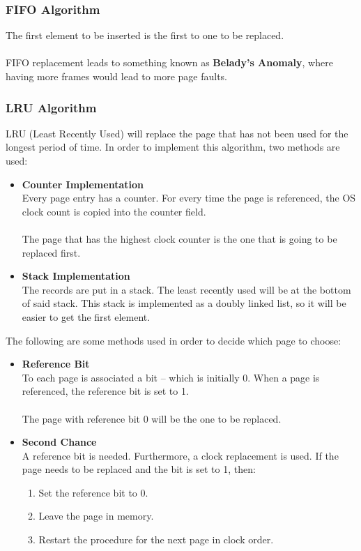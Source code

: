 \documentclass{article}
\begin{document}
\subsubsection{FIFO Algorithm}
The first element to be inserted is the first to one to be replaced. \\ \\
FIFO replacement leads to something known as \textbf{Belady's Anomaly}, where having more frames would lead to more page faults.

\subsubsection{LRU Algorithm}
LRU (Least Recently Used) will replace the page that has not been used for the longest period of time. In order to implement this algorithm, two methods are used:

\begin{itemize}
	\item \textbf{Counter Implementation}
	\vspace{.2cm} \\
	Every page entry has a counter. For every time the page is referenced, the OS clock count is copied into the counter field. \\ \\
	The page that has the highest clock counter is the one that is going to be replaced first.
	
	\item \textbf{Stack Implementation}
	\vspace{.2cm} \\
	The records are put in a stack. The least recently used will be at the bottom of said stack. This stack is implemented as a doubly linked list, so it will be easier to get the first element.
\end{itemize}
The following are some methods used in order to decide which page to choose:

\begin{itemize}
	\item \textbf{Reference Bit}
	\vspace{.2cm} \\
	To each page is associated a bit -- which is initially 0. When a page is referenced, the reference bit is set to 1. \\ \\
	The page with reference bit 0 will be the one to be replaced.
	
	\item \textbf{Second Chance}
	\vspace{.2cm} \\
	A reference bit is needed. Furthermore, a clock replacement is used. If the page needs to be replaced and the bit is set to 1, then:
	
	\begin{enumerate}
		\item Set the reference bit to 0.
		\item Leave the page in memory.
		\item Restart the procedure for the next page in clock order.
	\end{enumerate}
\end{itemize}
\end{document}
